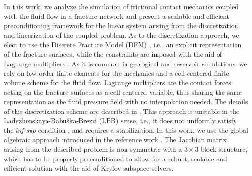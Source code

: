 \documentclass[3p,times]{elsarticle}
\theoremstyle{plain}
\begin{document}
In this work, we analyze the simulation of frictional contact
mechanics coupled with the fluid flow in a fracture network and present a scalable and efficient
preconditioning framework for the linear system arising from the discretization and linearization of
the coupled problem. As to the discretization approach, we elect to use the Discrete Fracture Model
(DFM) \cite{GarKarTch16}, i.e., an explicit representation of the fracture surfaces, while
the constraints are imposed with the aid of Lagrange multipliers \cite{hild2010stabilized,
JhaJua14, FraFerJanTea16, berge2020finite, koppel2019stabilized}. As it is common in geological and
reservoir simulations, we rely on low-order finite elements for the mechanics and
a cell-centered finite volume scheme for the fluid flow. Lagrange multipliers are the contact forces acting on
the fracture surfaces as a cell-centered variable, thus sharing the same representation as the fluid
pressure field with no interpolation needed. The details of this
discretization scheme are described in \cite{fr2020alg}. This approach is unstable in the 
Ladyzhenskaya-Babu\v{s}ka-Brezzi
(LBB) sense, i.e., it does not uniformly satisfy the
\textit{inf-sup} condition \cite[Section 3.1]{wohlmuth2011variationally}, and
requires a stabilization. %
In this work, we use the
global algebraic approach introduced in the reference work \cite{fr2020alg}. %
The Jacobian matrix arising
from the described problem is non-symmetric with a $3 \times 3$ block structure, which has to be properly preconditioned to allow for a robust, scalable and efficient solution with the aid of Krylov subspace solvers.
\end{document}
